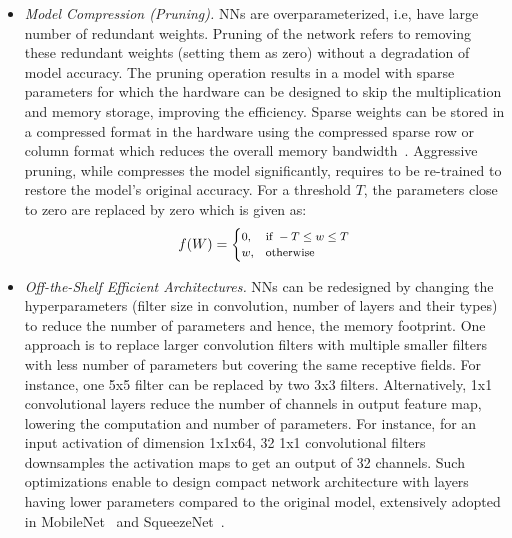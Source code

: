 \begin{itemize}[leftmargin=*]
\item {\em Model Compression (Pruning).}
NNs are overparameterized, i.e, have large number of redundant weights.
Pruning of the network refers to removing these redundant weights (setting them as zero) without a degradation of model accuracy.
The pruning operation results in a model with sparse parameters for which the hardware can be designed to skip the multiplication and memory storage, improving the efficiency.
Sparse weights can be stored in a compressed format in the hardware using the compressed sparse row or column format which reduces the overall memory bandwidth~\cite{DBLP:journals/corr/HanMD15,10.1109/ISCA.2016.30,Han:2015:LBW:2969239.2969366}.
Aggressive pruning, while compresses the model significantly, requires to be re-trained to restore the model's original accuracy.
For a threshold $T$, the parameters close to zero are replaced by zero which is given as:
\[
\footnotesize
    f(W)=
\begin{cases}
    0, & \text{if } -T \leq w \leq T\\
    w,  & \text{otherwise}
\end{cases}
\]

\item {\em Off-the-Shelf Efficient Architectures.}
NNs can be redesigned by changing the hyperparameters (filter size in convolution, number of layers and their types) to reduce the number of parameters and hence, the memory footprint.
One approach is to replace larger convolution filters with multiple smaller filters with less number of parameters but covering the same receptive fields.
For instance, one 5x5 filter can be replaced by two 3x3 filters.
Alternatively, 1x1 convolutional layers reduce the number of channels in output feature map, lowering the computation and number of parameters.
For instance, for an input activation of dimension 1x1x64, 32 1x1 convolutional filters downsamples the activation maps to get an output of 32 channels.
Such optimizations enable to design compact network architecture with layers having lower parameters compared to the original model, extensively adopted in MobileNet~\cite{conf/cvpr/SandlerHZZC18} and SqueezeNet~\cite{DBLP:journals/corr/IandolaMAHDK16}.



\end{itemize}
